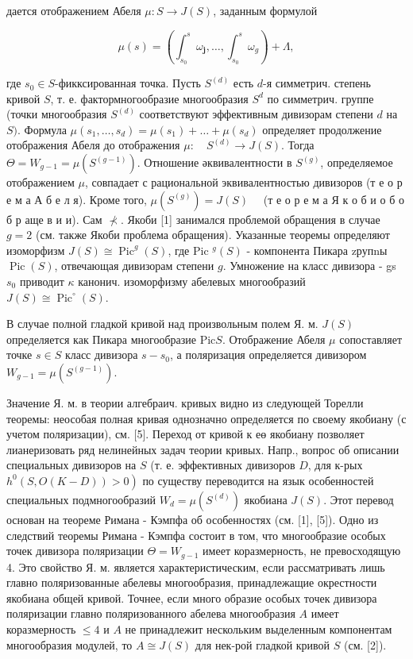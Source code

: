 \documentclass[10pt]{article}
\begin{document}
дается отображением Абеля $\mu: S \rightarrow J(S)$, заданным формулой



\[

\mu(s)=\left(\int_{s_{0}}^{s} \omega_{\mathbf{j}}, \ldots, \int_{s_{0}}^{s} \omega_{g}\right)+\Lambda,

\]



где $s_{0} \in S$-фикксированная точка. Пусть $S^{(d)}$ есть $d$-я симметрич. степень кривой $S$, т. е. фактормногообразие многообразия $S^{d}$ по симметрич. группе (точки многообразия $S^{(d)}$ соответствуют эффективным дивизорам степени $d$ на $S)$. Формула $\mu\left(s_{1}, \ldots, s_{d}\right)=\mu\left(s_{1}\right)+\ldots+\mu\left(s_{d}\right)$ определяет продолжение отображения Абеля до отображения $\mu: \quad S^{(d)} \longrightarrow J(S)$. Тогда $\Theta=W_{g-1}=\mu\left(S^{(g-1)}\right)$. Отношение әквивалентности в $S^{(g)}$, определяемое отображением $\mu$, совпадает с рациональной эквивалентностью дивизоров (т е о р е м а А б е л я). Кроме того, $\mu\left(S^{(g)}\right)=J(S) \quad$ (т е о р е м а Я к о б и о б о б р аще в и и). Сам $\nprec$. Якоби [1] занимался проблемой обращения в случае $g=2$ (см. также Якоби проблема обращения). Указанные теоремы определяют изоморфизм $J(S) \cong \operatorname{Pic}^{g}(S)$, где Pic $^{g}(S)$ - компонента Пикара zрупnы $\operatorname{Pic}(S)$, отвечающая дивизорам степени $g$. Умножение на класс дивизора - gs $s_{0}$ приводит $\kappa$ канонич. изоморфизму абелевых многообразий $J(S) \cong \operatorname{Pic}^{\circ}(S)$.



В случае полной гладкой кривой над произвольным полем Я. м. $J(S)$ определяется как Пикара многообразие $\mathrm{Pic} S$. Отображение Абеля $\mu$ сопоставляет точке $s \in S$ класс дивизора $s-s_{0}$, а поляризация определяется дивизором $W_{g-1}=\mu\left(S^{(g-1)}\right)$.



Значение Я. м. в теории алгебраич. кривых видно из следующей Торелли теоремы: неособая полная кривая однозначно определяется по своему якобиану (с учетом поляризации), см. [5]. Переход от кривой к еө якобиану позволяет лианеризовать ряд нелинейных задач теории кривых. Напр., вопрос об описании специальных дивизоров на $S$ (т. е. эффективных дивизоров $D$, для к-рых $\left.h^{0}(S, O(K-D))>0\right)$ по существу переводится на язык особенностей специальных подмногообразий $W_{d}=\mu\left(S^{(d)}\right)$ якобиана $J(S)$. Этот перевод основан на теореме Римана - Кэмпфа об особенностях (см. [1], [5]). Одно из следствий теоремы Римана - Кэмпфа состоит в том, что многообразие особых точек дивизора поляризации $\Theta=W_{g-1}$ имеет коразмерность, не превосходящую 4. Это свойство Я. м. является характеристическим, если рассматривать лишь главно поляризованные абелевы многообразия, принадлежащие окрестности якобиана общей кривой. Точнее, если много образие особых точек дивизора поляризации главно поляризованного абелева многообразия $A$ имеет коразмерность $\leqslant 4$ и $A$ не принадлежит нескольким выделенным компонентам многообразия модулей, то $A \cong J(S)$ для нек-рой гладкой кривой $S$ (см. [2]).
\end{document}
